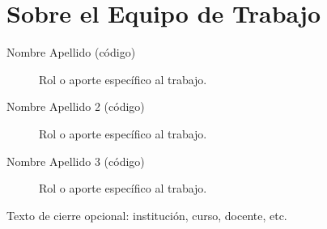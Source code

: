\documentclass[fleqn, final]{jaes}
\begin{document}
\section*{Sobre el Equipo de Trabajo}

\begin{description}
\item[Nombre Apellido (código)] Rol o aporte específico al trabajo.
\item[Nombre Apellido 2 (código)] Rol o aporte específico al trabajo.
\item[Nombre Apellido 3 (código)] Rol o aporte específico al trabajo.
\end{description}

\noindent Texto de cierre opcional: institución, curso, docente, etc.
\end{document}
